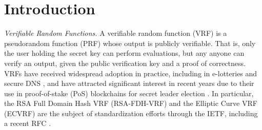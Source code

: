 
\section{Introduction}




\emph{Verifiable Random Functions.}
A verifiable random function (VRF) \cite{vrf_micali} is a pseudorandom function (PRF) whose output is publicly verifiable.
That is, only the user holding the secret key can perform evaluations, but any anyone can
verify an output, given the public verification key and a proof of correctness.
VRFs have received widespread adoption in practice, including in e-lotteries \cite{MicaliR02,LiangBM20} and secure DNS \cite{GoldbergNPRVZ15,PapadopoulosWHNVRG17}, and have attracted significant interest in recent years due to their use in proof-of-stake (PoS) blockchains for secret leader election \cite{ChenM19,KiayiasRDO17,DavidGKR17,BurdgesASV23a}.
In particular, the RSA Full Domain Hash VRF (RSA-FDH-VRF) and the Elliptic Curve VRF (ECVRF) are the subject of standardization efforts through the IETF, including a recent RFC \cite{VRF-RFC}.


